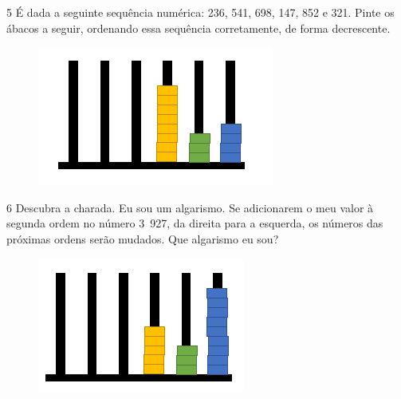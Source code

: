 
\pagebreak

\num{5} É dada a seguinte sequência numérica: 236, 541, 698, 147, 852 e 321. Pinte os
ábacos a seguir, ordenando essa sequência corretamente, de forma
decrescente.

\begin{figure}[htpb!]
\includegraphics[width=.2\textwidth]{./media/image7.png}
\end{figure}



\num{6} Descubra a charada. Eu sou um algarismo. Se adicionarem o meu valor à
segunda ordem no número 3~927, da direita para a esquerda, os números das próximas
ordens serão mudados. Que algarismo eu sou?


\begin{figure}[htpb!]
\includegraphics[width=\textwidth]{./media/image8.png}
\end{figure}


